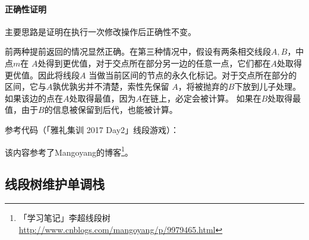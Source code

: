 \paragraph{正确性证明} 主要思路是证明在执行一次修改操作后正确性不变。

前两种提前返回的情况显然正确。在第三种情况中，假设有两条相交线段$A,B$，中点$m$在
$A$处得到更优值，对于交点所在部分另一边的任意一点，它们都在$A$处取得更优值。因此将线段$A$
当做当前区间的节点的永久化标记。对于交点所在部分的区间，它与$A$孰优孰劣并不清楚，索性先保留
$A$，将被抛弃的$B$下放到儿子处理。如果该边的点在$A$处取得最值，因为$A$在链上，必定会被计算。
如果在$B$处取得最值，由于$B$的信息被保留到后代，也能被计算。

参考代码（「雅礼集训 2017 Day2」线段游戏）：


该内容参考了Mangoyang的博客\footnote{
    「学习笔记」李超线段树\\
    \url{http://www.cnblogs.com/mangoyang/p/9979465.html}
}。
\subsection{线段树维护单调栈}
